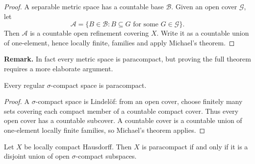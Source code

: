 \begin{proof}
A separable metric space has a countable base $\mathcal{B}$. Given an open
cover $\mathcal{G}$, let
\[
\mathcal{A}=\{B\in\mathcal{B}:B\subseteq G
\text{ for some }G\in\mathcal{G}\}.
\]
Then $\mathcal{A}$ is a countable open refinement covering $X$. Write it as a
countable union of one-element, hence locally finite, families and apply
Michael's theorem.
\end{proof}

\medskip
\noindent\textbf{Remark.}
In fact every metric space is paracompact, but proving the full theorem
requires a more elaborate argument.
\medskip

\begin{cor}
Every regular $\sigma$-compact space is paracompact.
\end{cor}

\begin{proof}
A $\sigma$-compact space is Lindel\"of: from an open cover, choose finitely many
sets covering each compact member of a countable compact cover. Thus every
open cover has a countable subcover. A countable cover is a countable union of
one-element locally finite families, so Michael's theorem applies.
\end{proof}

\begin{thm}
Let $X$ be locally compact Hausdorff. Then $X$ is paracompact if and only if
it is a disjoint union of open $\sigma$-compact subspaces.
\end{thm}

